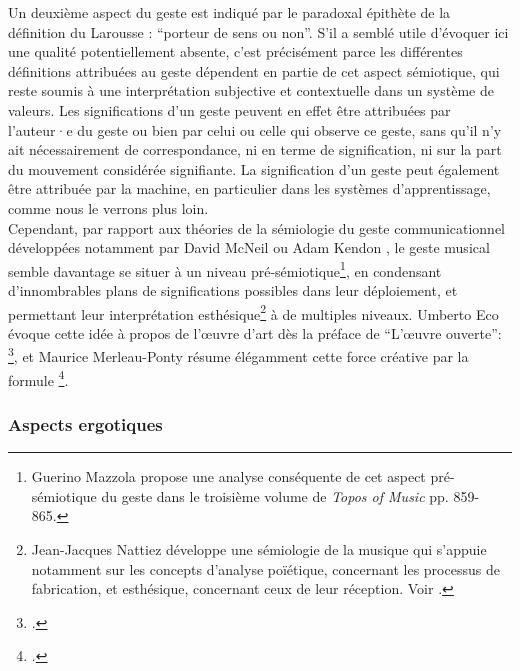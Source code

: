 \noindent Un deuxième aspect du geste est indiqué par le paradoxal épithète de la définition du Larousse : ``porteur de sens ou non''. S'il a semblé utile d'évoquer ici une qualité potentiellement absente, c'est précisément parce les différentes définitions attribuées au geste dépendent en partie de cet aspect sémiotique, qui reste soumis à une interprétation subjective et contextuelle dans un système de valeurs. Les significations d'un geste peuvent en effet être attribuées par l'auteur·e du geste ou bien par celui ou celle qui observe ce geste, sans qu'il n'y ait nécessairement de correspondance, ni en terme de signification, ni sur la part du mouvement considérée signifiante. La signification d'un geste peut également être attribuée par la machine, en particulier dans les systèmes d'apprentissage, comme nous le verrons plus loin.\\
\indent Cependant, par rapport aux théories de la sémiologie du geste communicationnel développées notamment par David McNeil \cite{mcneill_gesture_2005} ou Adam Kendon \cite{kendon_gesture:_2004}, le geste musical semble davantage se situer à un niveau pré-sémiotique\footnote{Guerino Mazzola propose une analyse conséquente de cet aspect pré-sémiotique du geste dans le troisième volume de \textit{Topos of Music} \cite{mazzola_topos_2018} pp. 859-865.}, en condensant d'innombrables plans de significations possibles dans leur déploiement, et permettant leur interprétation esthésique\footnote{Jean-Jacques Nattiez développe une sémiologie de la musique qui s'appuie notamment sur les concepts d'analyse poïétique, concernant les processus de fabrication, et esthésique, concernant ceux de leur réception. Voir \cite{nattiez_musicologie_1987}.} à de multiples niveaux. Umberto Eco évoque cette idée à propos de l'œuvre d'art dès la préface de ``L'œuvre ouverte'': \footnote{\cite{eco_loeuvre_2015}.}, et Maurice Merleau-Ponty résume élégamment cette force créative par la formule \footnote{\cite{merleau-ponty_phenomenologie_1976}.}.

\subsubsection{Aspects ergotiques}

